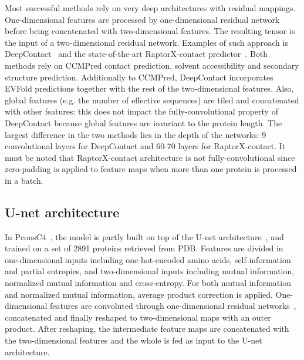         Most successful methods rely on very deep architectures with residual mappings.
        One-dimensional features are processed by one-dimensional residual network
        before being concatenated with two-dimensional features. The resulting tensor
        is the input of a two-dimensional residual network.
        Examples of such approach is DeepContact~\cite{DeepContact} and the state-of-the-art
        RaptorX-contact predictor~\cite{DeepContact}. Both methods rely on CCMPred contact
        prediction, solvent accessibility and secondary structure prediction.
        Additionally to CCMPred, DeepContact incorporates EVFold predictions together
        with the rest of the two-dimensional features. Also, global features (e.g. the number
        of effective sequences) are tiled and concatenated with other features: this does
        not impact the fully-convolutional property of DeepContact because global features
        are invariant to the protein length.
        The largest difference in the two methods lies in the depth of the networks:
        9 convolutional layers for DeepContact and 60-70 layers for RaptorX-contact.
        It must be noted that RaptorX-contact architecture is not fully-convolutional
        since zero-padding is applied to feature maps when more than one protein
        is processed in a batch.

    \subsection{U-net architecture}

        In PconsC4~\cite{Michel383133}, the model is partly built on top of the U-net
        architecture~\cite{DBLP:journals/corr/RonnebergerFB15}, and trained on a set
        of 2891 proteins retrieved from PDB. Features are divided in one-dimensional
        inputs including one-hot-encoded amino acids, self-information and
        partial entropies, and two-dimensional inputs including mutual information,
        normalized mutual information and cross-entropy.
        For both mutual information and normalized mutual information,
        average product correction is applied.
        One-dimensional features are convoluted through one-dimensional residual networks~,
        concatenated and finally reshaped to two-dimensional maps with an outer product.
        After reshaping, the intermediate feature maps are concatenated with the
        two-dimensional features and the whole is fed as input to the U-net architecture.

